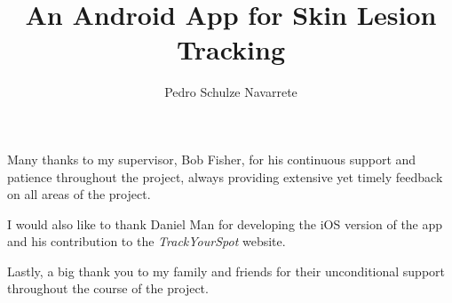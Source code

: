 \documentclass[bsc]{infthesis}
\title{An Android App for Skin Lesion Tracking}
\author{Pedro Schulze Navarrete}
\begin{document}
\pagestyle{plain}
\begin{preliminary}

\maketitle

\begin{acknowledgements}
Many thanks to my supervisor, Bob Fisher, for his continuous support and patience throughout the project, always providing extensive yet timely feedback on all areas of the project.

I would also like to thank Daniel Man for developing the iOS version of the app and his contribution to the \emph{TrackYourSpot} website.

Lastly, a big thank you to my family and friends for their unconditional support throughout the course of the project. 
\end{acknowledgements}

\standarddeclaration


\tableofcontents


\end{preliminary}








%

\begin{appendices}




\end{appendices}






\end{document}
